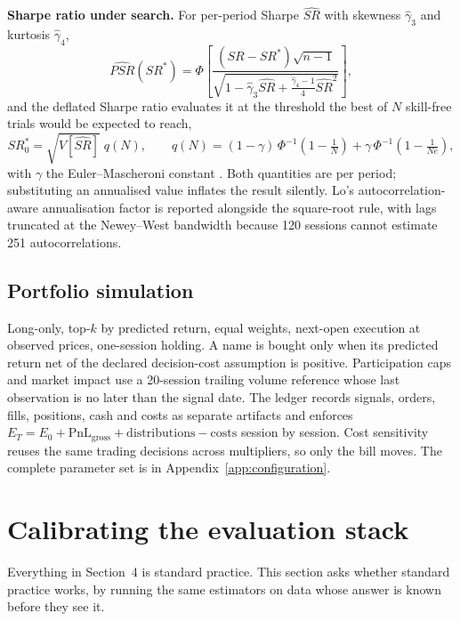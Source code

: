 \documentclass{article}
\theoremstyle{plain}
\theoremstyle{remark}
\begin{document}
\textbf{Sharpe ratio under search.} For per-period Sharpe $\hat{SR}$ with
skewness $\hat\gamma_3$ and kurtosis $\hat\gamma_4$,
\begin{equation}
\label{eq:psr}
\widehat{PSR}(SR^{\ast}) = \Phi\!\left[
\frac{(\hat{SR} - SR^{\ast})\sqrt{n-1}}
{\sqrt{1 - \hat\gamma_3 \hat{SR} + \frac{\hat\gamma_4 - 1}{4}\hat{SR}^2}}
\right],
\end{equation}
and the deflated Sharpe ratio evaluates it at the threshold the best of $N$
skill-free trials would be expected to reach,
\begin{equation}
\label{eq:dsr}
SR^{\ast}_0 = \sqrt{V[\hat{SR}]}\;q(N),
\qquad
q(N) = (1-\gamma)\,\Phi^{-1}\!\left(1 - \tfrac{1}{N}\right)
+ \gamma\,\Phi^{-1}\!\left(1 - \tfrac{1}{Ne}\right),
\end{equation}
with $\gamma$ the Euler--Mascheroni constant \citep{bailey2012,bailey2014dsr}.
Both quantities are per period; substituting an annualised value inflates the
result silently. Lo's autocorrelation-aware annualisation factor
\citep{lo2002} is reported alongside the square-root rule, with lags truncated at
the Newey--West bandwidth \citep{newey1987,newey1994} because 120 sessions cannot
estimate 251 autocorrelations.

\subsection{Portfolio simulation}

Long-only, top-$k$ by predicted return, equal weights, next-open execution at
observed prices, one-session holding. A name is bought only when its predicted
return net of the declared decision-cost assumption is positive. Participation
caps and market impact use a 20-session trailing volume reference whose last
observation is no later than the signal date. The ledger records signals, orders,
fills, positions, cash and costs as separate artifacts and enforces
$E_T = E_0 + \mathrm{PnL}_{\mathrm{gross}} + \mathrm{distributions} -
\mathrm{costs}$ session by session. Cost sensitivity reuses the same trading
decisions across multipliers, so only the bill moves. The complete parameter set
is in Appendix~\ref{app:configuration}.

\section{Calibrating the evaluation stack}
\label{sec:calibration}

Everything in Section~4 is standard practice. This section asks whether standard
practice works, by running the same estimators on data whose answer is known
before they see it.
\end{document}

